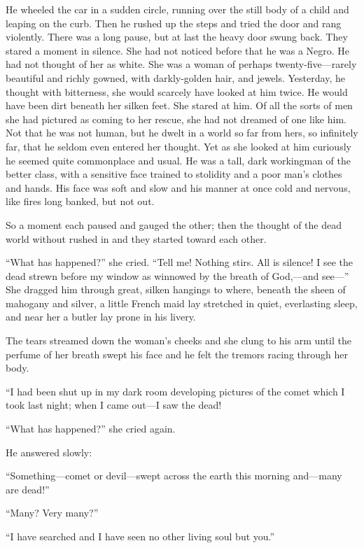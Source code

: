 He wheeled the car in a sudden circle, running over the still
body of a child and leaping on the curb. Then he rushed up the
steps and tried the door and rang violently. There was a long
pause, but at last the heavy door swung back. They stared a
moment in silence. She had not noticed before that he was a
Negro. He had not thought of her as white. She was a woman of
perhaps twenty-five---rarely beautiful and richly gowned, with
darkly-golden hair, and jewels. Yesterday, he thought with
bitterness, she would scarcely have looked at him twice. He
would have been dirt beneath her silken feet. She stared at
him.  Of all the sorts of men she had pictured as coming to
her rescue, she had not dreamed of one like him. Not that he
was not human, but he dwelt in a world so far from hers, so
infinitely far, that he seldom even entered her thought. Yet
as she looked at him curiously he seemed quite commonplace and
usual. He was a tall, dark workingman of the better class,
with a sensitive face trained to stolidity and a poor man's
clothes and hands. His face was soft and slow and his manner
at once cold and nervous, like fires long banked, but not out.

So a moment each paused and gauged the other; then the thought
of the dead world without rushed in and they started toward each
other.

``What has happened?'' she cried. ``Tell me! Nothing stirs. All is
silence! I see the dead strewn before my window as winnowed by
the breath of God,---and see---'' She dragged him through great,
silken hangings to where, beneath the sheen of mahogany and
silver, a little French maid lay stretched in quiet, everlasting
sleep, and near her a butler lay prone in his livery.

The tears streamed down the woman's cheeks and she clung to his
arm until the perfume of her breath swept his face and he felt
the tremors racing through her body.

``I had been shut up in my dark room developing pictures of the
comet which I took last night; when I came out---I saw the dead!

``What has happened?'' she cried again.

He answered slowly:

``Something---comet or devil---swept across the earth this morning
and---many are dead!''

``Many? Very many?''

``I have searched and I have seen no other living soul but you.''

